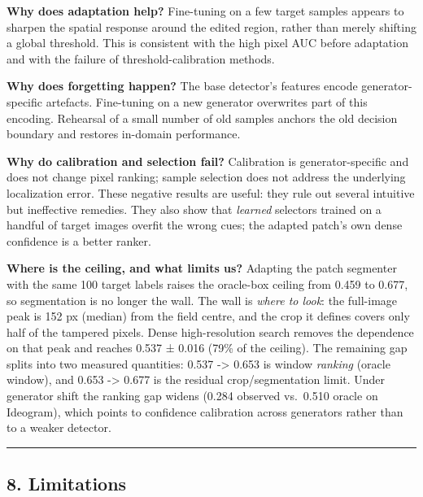 \textbf{Why does adaptation help?} Fine-tuning on a few target samples appears to sharpen the spatial response around the edited region, rather than merely shifting a global threshold. This is consistent with the high pixel AUC before adaptation and with the failure of threshold-calibration methods.

\textbf{Why does forgetting happen?} The base detector's features encode generator-specific artefacts. Fine-tuning on a new generator overwrites part of this encoding. Rehearsal of a small number of old samples anchors the old decision boundary and restores in-domain performance.

\textbf{Why do calibration and selection fail?} Calibration is generator-specific and does not change pixel ranking; sample selection does not address the underlying localization error. These negative results are useful: they rule out several intuitive but ineffective remedies. They also show that \emph{learned} selectors trained on a handful of target images overfit the wrong cues; the adapted patch's own dense confidence is a better ranker.

\textbf{Where is the ceiling, and what limits us?} Adapting the patch segmenter with the same 100 target labels raises the oracle-box ceiling from 0.459 to 0.677, so segmentation is no longer the wall. The wall is \emph{where to look}: the full-image peak is 152 px (median) from the field centre, and the crop it defines covers only half of the tampered pixels. Dense high-resolution search removes the dependence on that peak and reaches 0.537 ± 0.016 (79\% of the ceiling). The remaining gap splits into two measured quantities: 0.537 -\textgreater{} 0.653 is window \emph{ranking} (oracle window), and 0.653 -\textgreater{} 0.677 is the residual crop/segmentation limit. Under generator shift the ranking gap widens (0.284 observed vs.~0.510 oracle on Ideogram), which points to confidence calibration across generators rather than to a weaker detector.

\begin{center}\rule{0.5\linewidth}{0.5pt}\end{center}

\subsection{8. Limitations}\label{limitations}

